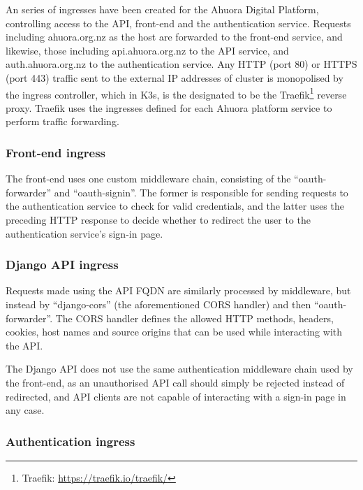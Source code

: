 An series of ingresses have been created for the Ahuora Digital Platform, controlling access to the API, front-end and the authentication service. Requests including ahuora.org.nz as the host are forwarded to the front-end service, and likewise, those including api.ahuora.org.nz to the API service, and auth.ahuora.org.nz to the authentication service. Any HTTP (port 80) or HTTPS (port 443) traffic sent to the external IP addresses of cluster is monopolised by the ingress controller, which in K3s, is the designated to be the Traefik\footnote{Traefik: \url{https://traefik.io/traefik/}} reverse proxy. Traefik uses the ingresses defined for each Ahuora platform service to perform traffic forwarding.


\subsubsection{Front-end ingress}

The front-end uses one custom middleware chain, consisting of the ``oauth-forwarder'' and ``oauth-signin''. The former is responsible for sending requests to the authentication service to check for valid credentials, and the latter uses the preceding HTTP response to decide whether to redirect the user to the authentication service's sign-in page.

\subsubsection{Django API ingress}

Requests made using the API FQDN are similarly processed by middleware, but instead by ``django-cors'' (the aforementioned CORS handler) and then ``oauth-forwarder''. The CORS handler defines the allowed HTTP methods, headers, cookies, host names and source origins that can be used while interacting with the API.

The Django API does not use the same authentication middleware chain used by the front-end, as an unauthorised API call should simply be rejected instead of redirected, and API clients are not capable of interacting with a sign-in page in any case.

\subsubsection{Authentication ingress}

